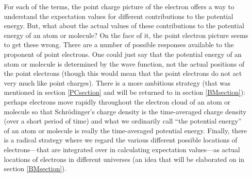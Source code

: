 \documentclass[12pt,onecolumn,secnumarabic,amsmath,amssymb,balancelastpage,nofootinbib]{article}
\begin{document}
For each of the terms, the point charge picture of the electron offers a way to understand the expectation values for different contributions to the potential energy.  But, what about the actual values of these contributions to the potential energy of an atom or molecule?  On the face of it, the point electron picture seems to get these wrong.  There are a number of possible responses available to the proponent of point electrons.  One could just say that the potential energy of an atom or molecule is determined by the wave function, not the actual positions of the point electrons (though this would mean that the point electrons do not act very much like point charges).  There is a more ambitious strategy (that was mentioned in section \ref{PCsection} and will be returned to in section \ref{BMsection}): perhaps electrons move rapidly throughout the electron cloud of an atom or molecule so that Schr\"{o}dinger's charge density is the time-averaged charge density (over a short period of time) and what we ordinarily call ``the potential energy'' of an atom or molecule is really the time-averaged potential energy.  Finally, there is a radical strategy where we regard the various different possible locations of electrons---that are integrated over in calculating expectation values---as actual locations of electrons in different universes (an idea that will be elaborated on in section \ref{BMsection}).
\end{document}
